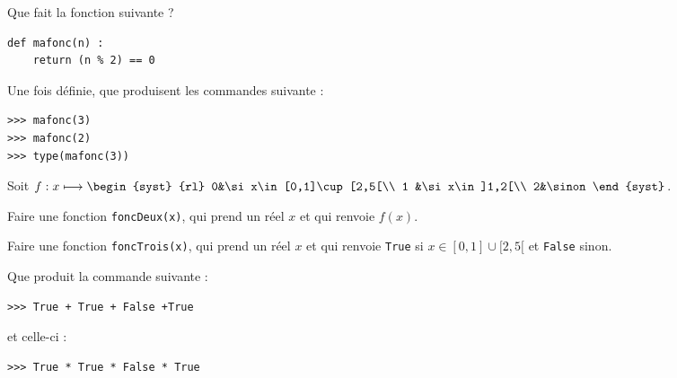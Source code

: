 \begin{enonce}
\ques Que fait la fonction suivante ?

\begin{verbatim}
def mafonc(n) :
    return (n % 2) == 0
\end{verbatim}    

\ques Une fois définie, que produisent les commandes suivante :
\begin{verbatim}
>>> mafonc(3)
>>> mafonc(2)
>>> type(mafonc(3))
\end{verbatim}

\ques Soit $f : x\lmt \begin{syst}
{rl}
0&\si x\in [0,1]\cup[2,5[\\
1 &\si x\in ]1,2[\\
2&\sinon
\end{syst}$.

Faire une fonction \texttt{foncDeux(x)}, qui prend un réel $x$ et qui renvoie $f(x)$.

\ques Faire une fonction \texttt{foncTrois(x)}, qui prend un réel $x$ et qui renvoie \texttt{True} si $x\in [0,1]\cup[2,5[$ et \texttt{False} sinon.

\ques Que produit la commande suivante :
\begin{verbatim}
>>> True + True + False +True
\end{verbatim}
et celle-ci :
\begin{verbatim}
>>> True * True * False * True
\end{verbatim}


\end{enonce}

\begin{correction}

\end{correction}


